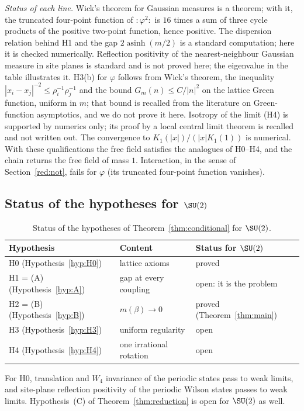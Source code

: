 \emph{Status of each line.} Wick's theorem for Gaussian measures is a theorem; with it, the truncated four-point function of $:\!\varphi^2\!:$ is $16$ times a sum of three cycle products of the positive two-point function, hence positive. The dispersion relation behind H1 and the gap $2\operatorname{asinh}(m/2)$ is a standard computation; here it is checked numerically. Reflection positivity of the nearest-neighbour Gaussian measure in site planes is standard and is not proved here; the eigenvalue in the table illustrates it. H3(b) for $\varphi$ follows from Wick's theorem, the inequality $|x_i-x_j|^{-2}\le\rho_i^{-1}\rho_j^{-1}$ and the bound $G_m(n)\le C/|n|^2$ on the lattice Green function, uniform in $m$; that bound is recalled from the literature on Green-function asymptotics, and we do not prove it here. Isotropy of the limit (H4) is supported by numerics only; its proof by a local central limit theorem is recalled and not written out. The convergence to $K_1(|x|)/(|x|K_1(1))$ is numerical. With these qualifications the free field satisfies the analogues of H0--H4, and the chain returns the free field of mass $1$. Interaction, in the sense of Section~\ref{red:not}, fails for $\varphi$ (its truncated four-point function vanishes).

\subsection{Status of the hypotheses for \texorpdfstring{$\SU(2)$}{SU(2)}}\label{red:statussec}

\begin{table}[ht]
\centering
\small
\begin{tabular}{@{}lll@{}}
\toprule
Hypothesis & Content & Status for $\SU(2)$ \\
\midrule
H0 (Hypothesis~\ref{hyp:H0}) & lattice axioms & proved \\
H1 = (A) (Hypothesis~\ref{hyp:A}) & gap at every coupling & open: it is the problem \\
H2 = (B) (Hypothesis~\ref{hyp:B}) & $m(\beta)\to0$ & proved (Theorem~\ref{thm:main}) \\
H3 (Hypothesis~\ref{hyp:H3}) & uniform regularity & open \\
H4 (Hypothesis~\ref{hyp:H4}) & one irrational rotation & open \\
\bottomrule
\end{tabular}
\caption{Status of the hypotheses of Theorem~\ref{thm:conditional} for $\SU(2)$.}\label{red:status}
\end{table}

For H0, translation and $W_4$ invariance of the periodic states pass to weak limits, and site-plane reflection positivity of the periodic Wilson states \cite{OS78} passes to weak limits. Hypothesis~(C) of Theorem~\ref{thm:reduction} is open for $\SU(2)$ as well.
